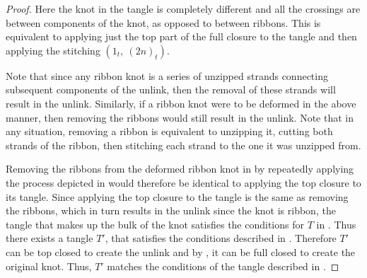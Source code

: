\begin{paper}
\begin{proof}


Here the knot in the tangle is completely different and all the crossings are
between components of the knot, as opposed to between ribbons.
This is equivalent to applying just the top part of the full closure to the
tangle and then applying the stitching $(1_t,~(2n)_t)$.



Note that since any ribbon knot is a series of unzipped strands connecting
subsequent components of the unlink, then the removal of these strands will
result in the unlink.
Similarly, if a ribbon knot were to be deformed in the above manner, then
removing the ribbons would still result in the unlink.
Note that in any situation, removing a ribbon is equivalent to unzipping
it, cutting both strands of the ribbon, then stitching each strand to the one it
was unzipped from.



Removing the ribbons from the deformed ribbon knot in \figTwisted by repeatedly
applying the process depicted in \figCut would therefore be identical to
applying the top closure to its tangle.
Since applying the top closure to the tangle is the same as removing the
ribbons, which in turn results in the unlink since the knot is ribbon, the
tangle that makes up the bulk of the knot satisfies the conditions for $T$ in
\lemTangles.
Thus there exists a tangle $T'$, that satisfies the conditions described in
\lemTangles.
Therefore $T'$ can be top closed to create the unlink and by \figComplete, it
can be full closed to create the original knot.
Thus, $T'$ matches the conditions of the tangle described in \thmRibbon.
\end{proof}


\end{paper}
